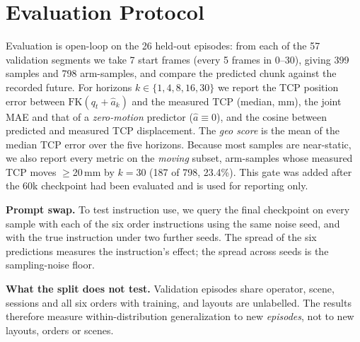 \documentclass[conference,10pt]{IEEEtran}
\newcommand{\mm}{\,mm\xspace}
\begin{document}
\section{Evaluation Protocol}\label{sec:eval}
Evaluation is open-loop on the 26 held-out episodes: from each of the 57 validation segments we take 7 start frames (every 5
frames in 0--30), giving 399 samples and 798 arm-samples, and compare the predicted chunk against the recorded future.
For horizons $k\in\{1,4,8,16,30\}$ we report the TCP position error between $\mathrm{FK}(q_t+\hat a_k)$ and the measured TCP
(median, mm), the joint MAE and that of a \emph{zero-motion} predictor ($\hat a\equiv0$), and the cosine between predicted and
measured TCP displacement. The \emph{geo score} is the mean of the median TCP error over the five horizons. Because most samples
are near-static, we also report every metric on the \emph{moving} subset, arm-samples whose measured TCP moves $\ge$20\mm by $k{=}30$
(187 of 798, 23.4\%). This gate was added after the 60k checkpoint had been evaluated and is used for reporting only.

\textbf{Prompt swap.} To test instruction use, we query the final checkpoint on every sample with each of the six order
instructions using the same noise seed, and with the true instruction under two further seeds. The spread of the six
predictions measures the instruction's effect; the spread across seeds is the sampling-noise floor.

\textbf{What the split does not test.} Validation episodes share operator, scene, sessions and all six orders with training,
and layouts are unlabelled. The results therefore measure within-distribution generalization to new \emph{episodes}, not to new
layouts, orders or scenes.
\end{document}
